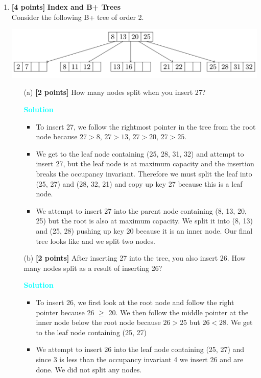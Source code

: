 \documentclass[10pt]{article}
\newenvironment{solution}
    { \begin{mdframed}[backgroundcolor=gray!10] \textcolor{cyan}{\textbf{Solution}} \\}
    {  \end{mdframed}}
\begin{document}
\begin{enumerate}


	\item \textbf{[4 points]} \textbf{Index and B+ Trees} \\
	      Consider the following B+ tree of order 2.
	      \begin{center}
		      \includegraphics[scale=0.25]{Btree.png}
	      \end{center}
	      \begin{itemize}
		      \item[(a)] \textbf{[2 points]} How many nodes split when you insert 27?
		            \begin{solution}
			            \begin{itemize}
				            \item To insert 27, we follow the rightmost pointer in the tree from the root node because
				                  $27 > 8$, $27 > 13$, $27 > 20$, $27 > 25$.
				            \item We get to the leaf node containing (25, 28, 31, 32) and attempt to insert 27, but the leaf node
				                  is at maximum capacity and the insertion breaks the occupancy invariant. Therefore we must
				                  split the leaf into (25, 27) and (28, 32, 21) and copy up key 27 because this is a leaf node.
				            \item We attempt to insert 27 into the parent node containing (8, 13, 20, 25) but the root is also at
				                  maximum capacity. We split it into (8, 13) and (25, 28) pushing up key 20 because it is an
				                  inner node. Our final tree looks like and we split two nodes.
			            \end{itemize}
		            \end{solution}

		      \item[(b)] \textbf{[2 points]} After inserting 27 into the tree, you also insert 26. How many nodes split as a result of inserting
		            26?
		            \begin{solution}
			            \begin{itemize}
				            \item To insert 26, we first look at the root node and follow the right pointer because 26 $\geq$ 20. We
				                  then follow the middle pointer at the inner node below the root node because $26 > 25$ but
				                  $26 < 28$. We get to the leaf node containing (25, 27)
				            \item We attempt to insert 26 into the leaf node containing (25, 27) and since 3 is less than the
				                  occupancy invariant 4 we insert 26 and are done. We did not split any nodes.
			            \end{itemize}
		            \end{solution}


\end{itemize}
\end{enumerate}
\end{document}
